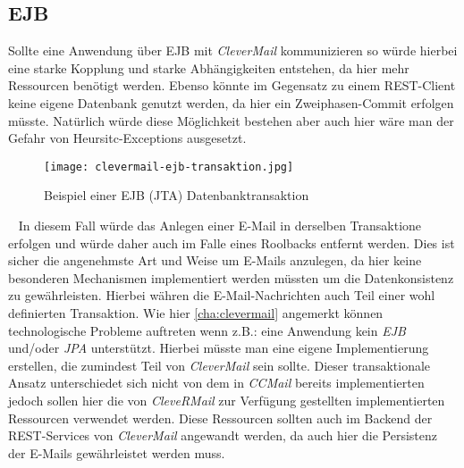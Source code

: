 \subsection{EJB}
Sollte eine Anwendung über EJB mit \emph{CleverMail} kommunizieren so würde hierbei eine starke Kopplung und starke Abhängigkeiten entstehen, da hier mehr Ressourcen benötigt werden. Ebenso könnte im Gegensatz zu einem REST-Client keine eigene Datenbank genutzt werden, da hier ein Zweiphasen-Commit erfolgen müsste. Natürlich würde diese Möglichkeit bestehen aber auch hier wäre man der Gefahr von Heursitc-Exceptions ausgesetzt.
\begin{figure}[h]
\centering
\texttt{[image: clevermail-ejb-transaktion.jpg]} %
\caption{Beispiel einer EJB (JTA) Datenbanktransaktion}
\label{fig:clevermail-rest-tcc}
\end{figure}
\ \newline
In diesem Fall würde das Anlegen einer E-Mail in derselben Transaktione erfolgen und würde daher auch im Falle eines Roolbacks entfernt werden. Dies ist sicher die angenehmste Art und Weise um E-Mails anzulegen, da hier keine besonderen Mechanismen implementiert werden müssten um die Datenkonsistenz zu gewährleisten. Hierbei währen die E-Mail-Nachrichten auch Teil einer wohl definierten Transaktion.
\newline
\newline
Wie hier \ref{cha:clevermail} angemerkt können technologische Probleme auftreten wenn z.B.: eine Anwendung kein \emph{EJB} und/oder \emph{JPA} unterstützt. Hierbei müsste man eine eigene Implementierung erstellen, die zumindest Teil von \emph{CleverMail} sein sollte.
\newline
\newline
Dieser transaktionale Ansatz unterschiedet sich nicht von dem in \emph{CCMail} bereits implementierten jedoch sollen hier die von \emph{CleveRMail} zur Verfügung gestellten implementierten Ressourcen verwendet werden. Diese Ressourcen sollten auch im Backend der REST-Services von \emph{CleverMail} angewandt werden, da auch hier die Persistenz der E-Mails gewährleistet werden muss. 